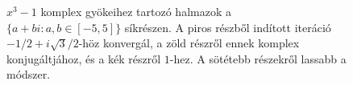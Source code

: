 \documentclass[a4paper,12pt]{report}
\begin{document}
			\begin{figure}[ht]
				\begin{center}
				{%
					\setlength{\fboxsep}{0pt}%
					\setlength{\fboxrule}{1pt}%
				}%
				\caption{$x^3-1$ komplex gyökeihez tartozó halmazok a $\{a+bi:a,b\in[-5,5]\}$ síkrészen. A piros részből indított iteráció $-1/2+i\sqrt{3}/2$-höz konvergál, a zöld részről ennek komplex konjugáltjához, és a kék részről $1$-hez. A sötétebb részekről lassabb a módszer.} \label{k10}
				\end{center}
			\end{figure}
\end{document}
